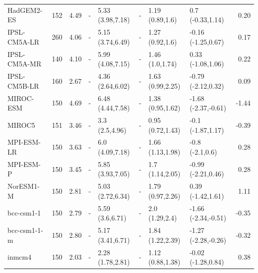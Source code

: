 \documentclass[esd, article]{copernicus}
\begin{document}
\begin{table}[t]
\begin{tabular}{llrrlrllr}
    HadGEM2-ES &   152 &       4.49 &         - &  5.33 (3.98,7.18) &       - &   1.19 (0.89,1.6) &     0.7 (-0.33,1.14) &         0.20 \\
  IPSL-CM5A-LR &   260 &       4.06 &         - &  5.15 (3.74,6.49) &       - &   1.27 (0.92,1.6) &   -0.16 (-1.25,0.67) &         0.17 \\
  IPSL-CM5A-MR &   140 &       4.10 &         - &  5.99 (4.08,7.15) &       - &   1.46 (1.0,1.74) &    0.33 (-1.08,1.06) &         0.22 \\
  IPSL-CM5B-LR &   160 &       2.67 &         - &  4.36 (2.64,6.02) &       - &  1.63 (0.99,2.25) &   -0.79 (-2.12,0.32) &         0.09 \\
     MIROC-ESM &   150 &       4.69 &         - &  6.48 (4.44,7.58) &       - &  1.38 (0.95,1.62) &  -1.68 (-2.37,-0.61) &        -1.44 \\
        MIROC5 &   151 &       3.46 &         - &    3.3 (2.5,4.96) &       - &  0.95 (0.72,1.43) &    -0.1 (-1.87,1.17) &        -0.39 \\
    MPI-ESM-LR &   150 &       3.63 &         - &   6.0 (4.09,7.18) &       - &  1.66 (1.13,1.98) &      -0.8 (-2.1,0.6) &         0.28 \\
     MPI-ESM-P &   150 &       3.45 &         - &  5.85 (3.93,7.05) &       - &   1.7 (1.14,2.05) &   -0.99 (-2.21,0.46) &         0.28 \\
     NorESM1-M &   150 &       2.81 &         - &  5.03 (2.72,6.34) &       - &  1.79 (0.97,2.26) &    0.39 (-1.42,1.61) &         1.11 \\
    bcc-csm1-1 &   150 &       2.79 &         - &   5.59 (3.6,6.71) &       - &    2.0 (1.29,2.4) &  -1.66 (-2.34,-0.51) &        -0.35 \\
  bcc-csm1-1-m &   150 &       2.80 &         - &  5.17 (3.41,6.71) &       - &  1.84 (1.22,2.39) &  -1.27 (-2.28,-0.26) &        -0.32 \\
        inmcm4 &   150 &       2.03 &         - &  2.28 (1.78,2.81) &       - &  1.12 (0.88,1.38) &   -0.02 (-1.28,0.84) &         0.38 \\
\bottomrule
\end{tabular}
\label{tbl:CMIP5}

\end{table}

\clearpage
\end{document}
